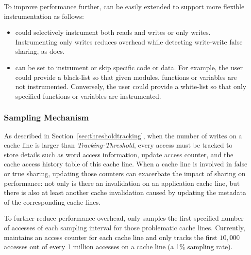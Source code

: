 To improve performance further,
\Predator{} can be easily extended to support more flexible instrumentation as follows:
\begin{itemize}
\item
\Predator{} could selectively instrument both reads and writes or only writes.
Instrumenting only writes reduces overhead while detecting write-write false sharing, 
as \Sheriff{} does. 
\item
\Predator{} can be set to instrument or skip specific code or data. 
For example, the user could provide a black-list so that given modules,
functions or variables are not instrumented. 
Conversely, the user could provide a white-list so that only specified functions or variables are instrumented. 
\end{itemize}

\subsubsection{Sampling Mechanism}
\label{sec:sample}
As described in Section~\ref{sec:thresholdtracking}, when the number of
writes on a cache line is larger than {\it Tracking-Threshold}, every
access must be tracked to store details such as word access
information, update access counter, and the cache access history table
of this cache line.  When a cache line is involved in false or true
sharing, updating those counters can exacerbate the impact of sharing
on performance: not only is there an invalidation on an application
cache line, but there is also at least another cache invalidation
caused by updating the metadata of the corresponding cache lines.

To further reduce performance overhead, \Predator{} only samples the first specified
number of accesses of each sampling interval for those problematic cache lines. 
Currently, \Predator{} maintains an access counter for each cache line
and only tracks the first $10,000$ accesses out of every 1 million
accesses on a cache line (a 1\% sampling rate).

